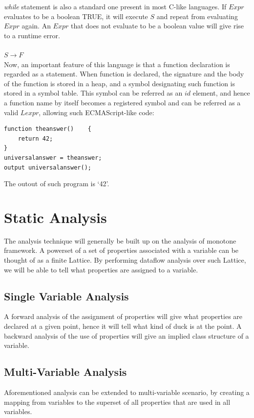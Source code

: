 \documentclass[a4paper,12pt]{article}
\begin{document}
\textit{while} statement is also a standard one present in most C-like languages. If $Expr$ evaluates to be a boolean TRUE, it will execute $S$ and repeat from evaluating $Expr$ again. An $Expr$ that does not evaluate to be a boolean value will give rise to a runtime error.\\\\
$S \rightarrow F$\\
Now, an important feature of this language is that a function declaration is regarded as a statement. When function is declared, the signature and the body of the function is stored in a heap, and a symbol designating such function is stored in a symbol table. This symbol can be referred as an $id$ element, and hence a function name by itself becomes a registered symbol and can be referred as a valid $Lexpr$, allowing such ECMAScript-like code:\\
\medskip
\begin{lstlisting}[caption=Function declaration as a statement]
function theanswer()	{
	return 42;
}
universalanswer = theanswer;
output universalanswer();
\end{lstlisting}
The outout of such program is `42'.
\section{Static Analysis}
The analysis technique will generally be built up on the analysis of monotone framework. A powerset of a set of properties associated with a variable can be thought of as a finite Lattice. By performing dataflow analysis over such Lattice, we will be able to tell what properties are assigned to a variable.\\
\subsection{Single Variable Analysis}
A forward analysis of the assignment of properties will give what properties are declared at a given point, hence it will tell what kind of duck is at the point. A backward analysis of the use of properties will give an implied class structure of a variable.\\
\subsection{Multi-Variable Analysis}
Aforementioned analysis can be extended to multi-variable scenario, by creating a mapping from variables to the superset of all properties that are used in all variables.
\end{document}
